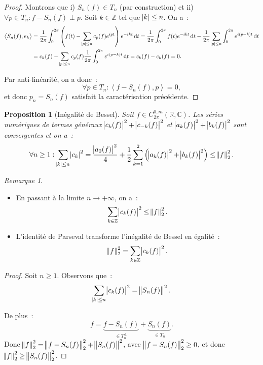 \documentclass{report}
\newtheorem{prp}[thm]{Proposition}
\theoremstyle{definition}
\theoremstyle{remark}
\newtheorem*{rmq}{Remarque}
\numberwithin{equation}{section}
\newcommand{\C}{\mathbb C}
\newcommand{\R}{\mathbb R}
\newcommand{\Z}{\mathbb Z}
\newcommand{\scpr}[2]{\left\langle #1, #2\right\rangle}
\newcommand{\pinfty}{{+\infty}}
\newcommand{\CmT}[2]{C^{#1,m}_{#2}}
\newcommand{\CzmT}[1]{\CmT 0{#1}}
\newcommand{\Czm}{\CzmT{2\pi}}
\begin{document}
			\begin{proof} Montrons que i) $S_n(f) \in T_n$ (par construction) et ii) $\forall p \in T_n : f-S_n(f) \perp p$. Soit $k \in \Z$ tel que
			$\abs k \leq n$. On a~:
			\begin{align}
				\scpr {S_n(f)}{e_k} &= \frac 1{2\pi}\int_0^{2\pi}\left(f(t) - \sum_{\abs p \leq n}c_p(f)e^{ipt}\right)e^{-ikt}\dif t
						= \frac 1{2\pi}\int_0^{2\pi}f(t)e^{-ikt}\dif t - \frac 1{2\pi}\sum_{\abs p \leq n}\int_0^{2\pi}e^{i(p-k)t}\dif t \\
					&= c_k(f) - \sum_{\abs p \leq n}c_p(f)\frac 1{2\pi}\int_0^{2\pi}e^{i(p-k)t}\dif t = c_k(f) - c_k(f) = 0.
			\end{align}

			Par anti-linéarité, on a donc~:
			\begin{equation}
				\forall p \in T_n : \scpr {f-S_n(f)}p = 0,
			\end{equation}
			et donc $p_n = S_n(f)$ satisfait la caractérisation précédente.
			\end{proof}

			\begin{prp}[Inégalité de Bessel] Soit $f \in \Czm(\R, \C)$. Les séries numériques de termes généraux $\abs {c_k(f)}^2 + \abs {c_{-k}(f)}^2$
			et $\abs {a_k(f)}^2 + \abs {b_k(f)}^2$ sont convergentes et on a~:
			\begin{equation}
				\forall n \geq 1 : \sum_{\abs k \leq n}\abs {c_k}^2 = \frac {\abs {a_0(f)}^2}4 + \frac 12\sum_{k=1}^2\left(\abs {a_k(f)}^2 + \abs {b_k(f)}^2\right) \leq \norm f_2^2.
			\end{equation}
			\end{prp}

			\begin{rmq}~
				\begin{itemize}
					\item En passant à la limite $n \to \pinfty$, on a~:
					\begin{equation}
						\sum_{k \in \Z}\abs {c_k(f)}^2 \leq \norm f_2^2.
					\end{equation}
					\item L'identité de Parseval transforme l'inégalité de Bessel en égalité~:
					\begin{equation}
						\norm f_2^2 = \sum_{k \in \Z}\abs {c_k(f)}^2.
					\end{equation}
				\end{itemize}
			\end{rmq}

			\begin{proof} Soit $n \geq 1$. Observons que~:
			\begin{equation}
				\sum_{\abs k \leq n}\abs {c_k(f)}^2 = \norm {S_n(f)}^2.
			\end{equation}

			De plus~:
			\begin{equation}
				f = \underbrace {f - S_n(f)}_{\in T_n^\perp} + \underbrace {S_n(f)}_{\in T_n}.
			\end{equation}
			Donc $\norm f_2^2 = \norm {f-S_n(f)}_2^2 + \norm {S_n(f)}^2$, avec $\norm {f - S_n(f)}_2^2 \geq 0$, et donc $\norm f_2^2 \geq \norm {S_n(f)}_2^2$.
			\end{proof}
\end{document}
